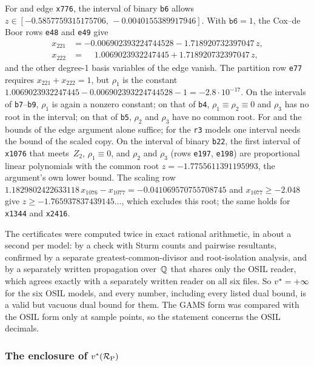 For  and edge \texttt{x776}, the interval of binary \texttt{b6} allows $z\in[-0.5857759315175706,\allowbreak\,-0.0040155389917946]$.
With $\texttt{b6}=1$, the Cox--de Boor rows \texttt{e48} and \texttt{e49} give
\[
\begin{aligned}
x_{221}&=-0.006902393224744528-1.718920732397047\,z,\\
x_{222}&=\phantom{-}1.0069023932247445+1.718920732397047\,z,
\end{aligned}
\]
and the other degree-1 basis variables of the edge vanish.
The partition row \texttt{e77} requires $x_{221}+x_{222}=1$, but $\rho_1$ is the constant $1.0069023932247445-0.006902393224744528-1=-2.8\cdot10^{-17}$.
On the intervals of \texttt{b7}--\texttt{b9}, $\rho_1$ is again a nonzero constant; on that of \texttt{b4}, $\rho_1\equiv\rho_2\equiv0$ and $\rho_3$ has no root in the interval; on that of \texttt{b5}, $\rho_2$ and $\rho_3$ have no common root.
For  and  the bounds of the edge argument alone suffice; for the \texttt{r3} models one interval needs the bound of the scaled copy.
On the interval of binary \texttt{b22}, the first interval of \texttt{x1076} that meets~$Z_2$, $\rho_1\equiv0$, and $\rho_2$ and $\rho_3$ (rows \texttt{e197}, \texttt{e198}) are proportional linear polynomials with the common root $z=-1.7755611391195993$, the argument's own lower bound.
The scaling row $1.1829802422633118\,x_{1076}-x_{1077}=-0.041069570755708745$ and $x_{1077}\ge-2.048$ give $z\ge-1.765937837439145\ldots$, which excludes this root; the same holds for \texttt{x1344} and \texttt{x2416}.

The certificates were computed twice in exact rational arithmetic, in about a second per model: by a check with Sturm counts and pairwise resultants, confirmed by a separate greatest-common-divisor and root-isolation analysis, and by a separately written propagation over~$\mathbb{Q}$ that shares only the OSIL reader, which agrees exactly with a separately written reader on all six files.
So $v^{*}=+\infty$ for the six OSIL models, and every number, including every listed dual bound, is a valid but vacuous dual bound for them.
The GAMS form was compared with the OSIL form only at sample points, so the statement concerns the OSIL decimals.

\subsubsection{The enclosure of \texorpdfstring{$v^{*}(\mathcal{R}_{\mathrm{P}})$}{v*(R\_P)}}\label{app:annkan-kan-enclosure}

